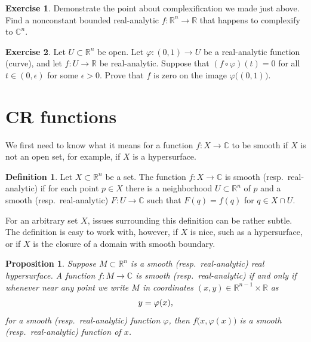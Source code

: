 \documentclass[12pt,openany]{book}
\newcommand{\avoidbreak}{\postdisplaypenalty=100}
\newcommand{\C}{{\mathbb{C}}}
\newcommand{\R}{{\mathbb{R}}}
\theoremstyle{plain}
\newtheorem{prop}[thm]{Proposition}
\theoremstyle{remark}
\theoremstyle{definition}
\newtheorem{defn}[thm]{Definition}
\newenvironment{exbox}{%
    \def\FrameCommand{\vrule width 1pt \relax\hspace{10pt}}%
    \MakeFramed{\advance\hsize-\width\FrameRestore}%
}{%
    \endMakeFramed
}
\theoremstyle{exercise}
\newtheorem{exercise}{Exercise}[section]
\theoremstyle{example}
\begin{document}
\begin{exbox}
\begin{exercise}
Demonstrate the point about complexification we made just above.
Find a nonconstant bounded real-analytic $f \colon \R^n \to \R$
that happens to complexify to $\C^n$.
\end{exercise}

\begin{exercise}
Let $U \subset \R^n$ be open.  Let $\varphi \colon (0,1) \to U$ be a
real-analytic function (curve), and let $f \colon U \to \R$ be
real-analytic.  Suppose that $(f \circ \varphi)(t) = 0$ for all $t \in
(0,\epsilon)$ for some $\epsilon > 0$.  Prove that $f$ is zero on the
image $\varphi\bigl((0,1)\bigr)$.
\end{exercise}
\end{exbox}


\section{CR functions}

We first need to know what it means for a function $f \colon X \to \C$
to be smooth if $X$ is not an open set, for example, if $X$ is a hypersurface.

\begin{defn}
Let $X \subset \R^n$ be a set.
The function $f \colon X \to \C$ is smooth (resp.\
real-analytic) if for each point $p \in X$ there is a
neighborhood $U \subset \R^n$ of $p$ and a smooth (resp.\ real-analytic) $F
\colon U \to \C$ such that $F(q) = f(q)$ for $q \in X \cap U$.
\end{defn}

For an arbitrary set $X$, issues surrounding this definition can be
rather subtle.  The definition
is easy to work with,
however, if $X$ is nice, such as a hypersurface, or if $X$ is
the closure of a domain with smooth boundary.

\begin{prop}
Suppose $M \subset \R^n$ is a smooth (resp.\ real-analytic) real hypersurface.
A function $f \colon M \to \C$
is smooth (resp.\ real-analytic) if and only if whenever near any point we write
$M$ in coordinates $(x,y) \in \R^{n-1} \times \R$ as
\begin{equation*}
y = \varphi(x) ,
\avoidbreak
\end{equation*}
for a smooth (resp.\ real-analytic) function $\varphi$, then
$f\bigl(x,\varphi(x)\bigr)$ is a smooth (resp.\ real-analytic) function of $x$.
\end{prop}
\end{document}
